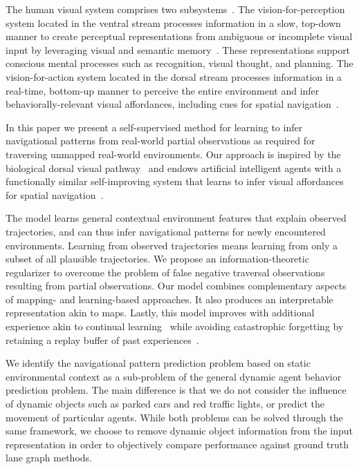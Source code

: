 \documentclass[letterpaper, 10 pt, conference]{ieeeconf}
\begin{document}
The human visual system comprises two subsystems~\cite{gibson1979visual_system, milner2008visual_systems, han2022modeling_ventral_dorsal}.
The vision-for-perception system located in the ventral stream processes information in a slow, top-down manner to create perceptual representations from ambiguous or incomplete visual input by leveraging visual and semantic memory~\cite{milner2008visual_systems}. These representations support conscious mental processes such as recognition, visual thought, and planning.
The vision-for-action system located in the dorsal stream processes information in a real-time, bottom-up manner to perceive the entire environment and infer behaviorally-relevant visual affordances, including cues for spatial navigation~\cite{milner2008visual_systems, milner2012visual_processing_conscious}.


In this paper we present a self-supervised method for learning to infer navigational patterns from real-world partial observations as required for traversing unmapped real-world environments.
Our approach is inspired by the biological dorsal visual pathway~\cite{milner2008visual_systems} and endows artificial intelligent agents with a functionally similar self-improving system that learns to infer visual affordances for spatial navigation~\cite{sheth2016visual_pathways_sampling_space}.

The model learns general contextual environment features that explain observed trajectories, and can thus infer navigational patterns for newly encountered environments. Learning from observed trajectories means learning from only a subset of all plausible trajectories. We propose an information-theoretic regularizer to overcome the problem of false negative traversal observations resulting from partial observations.
Our model combines complementary aspects of mapping- and learning-based approaches. It also produces an interpretable representation akin to maps. Lastly, this model improves with additional experience akin to continual learning~\cite{lesort2020cont_learn_robot} while avoiding catastrophic forgetting by retaining a replay buffer of past experiences~\cite{minh2015dqn}.


We identify the navigational pattern prediction problem based on static environmental context as a sub-problem of the general dynamic agent behavior prediction problem. The main difference is that we do not consider the influence of dynamic objects such as parked cars and red traffic lights, or predict the movement of particular agents.
While both problems can be solved through the same framework, we choose to remove dynamic object information from the input representation in order to objectively compare performance against ground truth lane graph methods.
\end{document}
